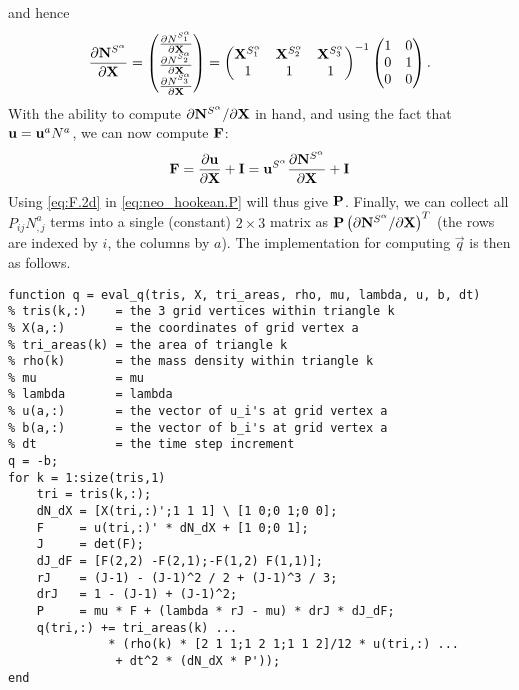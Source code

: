 and hence
\begin{equation*}
\frac{\partial \mathbf{N}^{S^{\alpha}}}{\partial \mathbf{X}}
=
\begin{pmatrix} \frac{\partial N^{S^{\alpha}_1}}{\partial \mathbf{X}} \\ \frac{\partial N^{S^{\alpha}_2}}{\partial \mathbf{X}} \\ \frac{\partial N^{S^{\alpha}_3}}{\partial \mathbf{X}} \end{pmatrix}
=
\begin{pmatrix} \mathbf{X}^{S^{\alpha}_1} & \mathbf{X}^{S^{\alpha}_2} & \mathbf{X}^{S^{\alpha}_3} \\ 1 & 1 & 1 \end{pmatrix}^{-1}
\begin{pmatrix} 1 & 0 \\ 0 & 1 \\ 0 & 0 \end{pmatrix}.
\end{equation*}
With the ability to compute $\partial \mathbf{N}^{S^{\alpha}} / \partial \mathbf{X}$ in hand, and using the fact that $\mathbf{u} = \mathbf{u}^a N^a$, we can now compute $\mathbf{F}$:
\begin{equation}\label{eq:F.2d}
\mathbf{F} = \frac{\partial \mathbf{u}}{\partial \mathbf{X}} + \mathbf{I}
           = \mathbf{u}^{S^{\alpha}} \frac{\partial \mathbf{N}^{S^{\alpha}}}{\partial \mathbf{X}} + \mathbf{I}
\end{equation}
Using \eqref{eq:F.2d} in \eqref{eq:neo_hookean.P} will thus give $\mathbf{P}$. Finally, we can collect all $P_{ij} N^a_{,j}$ terms into a single (constant) $2 \times 3$ matrix as $\mathbf{P} \left( \partial \mathbf{N}^{S^{\alpha}} / \partial \mathbf{X} \right)^T$ (the rows are indexed by $i$, the columns by $a$). The implementation for computing $\vec{q}$ is then as follows.
\begin{verbatim}
function q = eval_q(tris, X, tri_areas, rho, mu, lambda, u, b, dt)
% tris(k,:)    = the 3 grid vertices within triangle k
% X(a,:)       = the coordinates of grid vertex a
% tri_areas(k) = the area of triangle k
% rho(k)       = the mass density within triangle k
% mu           = mu
% lambda       = lambda
% u(a,:)       = the vector of u_i's at grid vertex a
% b(a,:)       = the vector of b_i's at grid vertex a
% dt           = the time step increment
q = -b;
for k = 1:size(tris,1)
    tri = tris(k,:);
    dN_dX = [X(tri,:)';1 1 1] \ [1 0;0 1;0 0];
    F     = u(tri,:)' * dN_dX + [1 0;0 1];
    J     = det(F);
    dJ_dF = [F(2,2) -F(2,1);-F(1,2) F(1,1)];
    rJ    = (J-1) - (J-1)^2 / 2 + (J-1)^3 / 3;
    drJ   = 1 - (J-1) + (J-1)^2;
    P     = mu * F + (lambda * rJ - mu) * drJ * dJ_dF;
    q(tri,:) += tri_areas(k) ...
              * (rho(k) * [2 1 1;1 2 1;1 1 2]/12 * u(tri,:) ...
               + dt^2 * (dN_dX * P'));
end
\end{verbatim}

